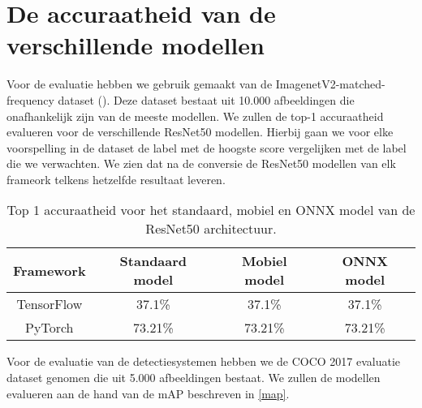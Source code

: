 \section{De accuraatheid van de verschillende modellen}

Voor de evaluatie hebben we gebruik gemaakt van de ImagenetV2-matched-frequency dataset (\cite{recht2019imagenet}).
Deze dataset bestaat uit 10.000 afbeeldingen die onafhankelijk zijn van de meeste modellen.
We zullen de top-1 accuraatheid evalueren voor de verschillende ResNet50 modellen.
Hierbij gaan we voor elke voorspelling in de dataset de label met de hoogste score vergelijken met de label die we verwachten.
We zien dat na de conversie de ResNet50 modellen van elk frameork telkens hetzelfde resultaat leveren.

\begin{table}[!ht]
    \caption{Top 1 accuraatheid voor het standaard, mobiel en ONNX model van de ResNet50 architectuur.}
\begin{tabular}{cccc}
    \hline
    Framework & Standaard model & Mobiel model & ONNX model \\
    \hline
    TensorFlow & 37.1\% & 37.1\% & 37.1\%  \\
    PyTorch & 73.21\% & 73.21\% & 73.21\%  \\
    \hline
\end{tabular}
\label{tab:class_acc}
\end{table}

Voor de evaluatie van de detectiesystemen hebben we de COCO 2017 evaluatie dataset genomen die uit 5.000 afbeeldingen bestaat.
We zullen de modellen evalueren aan de hand van de mAP beschreven in \ref{map}.

